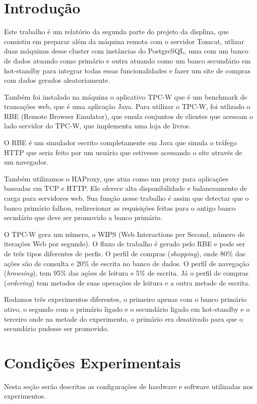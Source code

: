 \documentclass[11pt,twoside]{article}
\begin{document}
\section{Introdução}
Este trabalho \'e um relat\'orio da segunda parte do projeto da displina, que consistiu em preparar além da m\'aquina remota com o servidor Tomcat, utlizar duas máquinas desse cluster com instâncias do PostgreSQL, uma com um banco de dados atuando como primário e outra atuando como um banco secundário em hot-standby para integrar todas essas funcionalidades e fazer um site de compras com dados gerados aleatoriamente.

    Também foi instalado na máquina o aplicativo TPC-W que \'e um benchmark de transa\c{c}\~oes web, que é uma aplica\c{c}\~ao Java. Para utilizar o TPC-W, foi utlizado o RBE (Remote Browser Emulator), que emula conjuntos de clientes que acessam o lado servidor do TPC-W, que implementa uma loja de livros.

    O RBE \'e um simulador escrito completamente em Java que simula o tr\'afego HTTP que seria feito por um usu\'ario que estivesse acessando o site atrav\'es de um navegador.

    Também utilizamos o HAProxy, que atua como um proxy para aplicações baseadas em TCP e HTTP. Ele oferece alta disponibilidade e balanceamento de carga para servidores web. Sua função nesse trabalho é assim que detectar que o banco primário falhou, redirecionar as requisições feitas para o antigo banco secndário que deve ser promovido a banco primário.

    O TPC-W gera um n\'umero, o WIPS (Web Interactions per Second, n\'umero de itera\c{c}\~oes Web por segundo). O fluxo de trabalho é gerado pelo RBE e pode ser de tr\^es tipos diferentes de perfis. O perfil de compras (\textit{shopping}), onde 80\% das a\c{c}\~oes são de consulta e 20\% de escrita no banco de dados. O perfil de navega\c{c}\~ao (\textit{browsing}), tem 95\% das a\c{c}\~oes de leitura e 5\% de escrita. J\'a o perfil de compras (\textit{ordering}) tem metades de suas opera\c{c}\~oes de leitura e a outra metade de escrita.

    Rodamos três experimentos diferentes, o primeiro apenas com o banco primário ativo, o segundo com o primário ligado e o secundário ligado em hot-standby e o terceiro onde na metade do experimento, o primário era desativado para que o secundário pudesse ser promovido.

\setlength{\parindent}{4ex}


\section{Condições Experimentais}
\setlength{\parindent}{4ex}
     Nesta se\c{c}\~ao ser\~ao descritas as configura\c{c}\~oes de hardware e software utilizadas nos experimentos.
\end{document}
